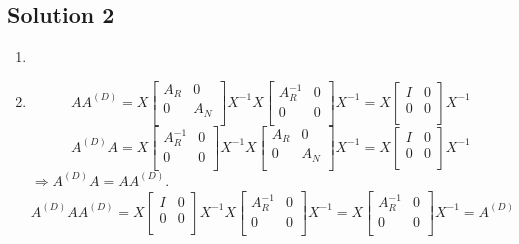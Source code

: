 \documentclass{article}
\begin{document}
\subsection*{Solution 2}
\begin{enumerate}
    \item 
    \item 
    \[AA^{(D)} = X \left[
    \begin{array}{cc}
     A_R & 0 \\
     0 &  A_N \\
    \end{array}
    \right]X^{-1}X\left[
    \begin{array}{cc}
     A_R ^ {-1} & 0 \\
     0 &  0 \\
    \end{array}
    \right]X^{-1}
    =
    X\left[
    \begin{array}{cc}
     I  & 0 \\
     0 &  0 \\
    \end{array}
    \right]X^{-1}
    \]
    \[A^{(D)}A = X \left[
    \begin{array}{cc}
     A_R ^ {-1} & 0 \\
     0 &  0 \\
    \end{array}
    \right]X^{-1}X\left[
    \begin{array}{cc}
     A_R & 0 \\
     0 &  A_N \\
    \end{array}
    \right]X^{-1}
    =
    X\left[
    \begin{array}{cc}
     I  & 0 \\
     0 &  0 \\
    \end{array}
    \right]X^{-1}
    \]
    $\Rightarrow A^{(D)}A = AA ^ {(D)}$. \\
    \[A ^ {(D)} A A ^ {(D)} = X\left[
    \begin{array}{cc}
     I  & 0 \\
     0 &  0 \\
    \end{array}
    \right]X^{-1}X \left[
    \begin{array}{cc}
     A_R ^ {-1} & 0 \\
     0 &  0 \\
    \end{array}
    \right]X^{-1} = X \left[
    \begin{array}{cc}
     A_R ^ {-1} & 0 \\
     0 &  0 \\
    \end{array}
    \right]X^{-1} = A^{(D)}
    \]
    

\end{enumerate}
\end{document}
